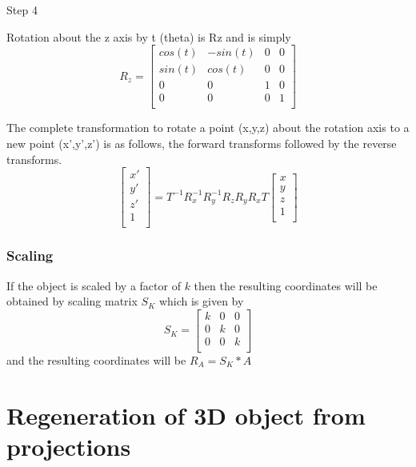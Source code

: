 \documentclass{article}
\begin{document}
 Step 4

Rotation about the z axis by t (theta) is Rz and is simply
\begin{equation}
R_{z}  =
\left[\begin{matrix}
cos(t) & -sin(t) & 0& 0\\
sin(t)  & cos(t) & 0& 0\\
0 & 0& 1& 0\\
0&0&0&1\\
\end{matrix}\right]

\end{equation}


The complete transformation to rotate a point (x,y,z) about the rotation axis to a new point (x',y',z') is as follows, the forward transforms followed by the reverse transforms.
\begin{equation}
\left[\begin{matrix}
x'\\
y'\\
z'\\
1\\
\end{matrix}\right] =
T^{-1}R_{x}^{-1}R_{y}^{-1}R_{z}R_{y}R_{x}T
\left[\begin{matrix}
x\\
y\\
z\\
1\\
\end{matrix}\right]

\end{equation}
   

\subsubsection{Scaling}
\hspace{15mm}If the object is scaled by a factor of $k$ then the resulting coordinates will be
obtained by scaling matrix $S_{K}$ which is given by
\begin{equation}
S_{K} =
\left[\begin{matrix}
k & 0 & 0\\
0 & k & 0\\
0 & 0 & k\\
\end{matrix}\right]
\end{equation}
and the resulting coordinates will be $R_{A}=S_{K}*A$
\section{Regeneration of 3D object from projections}
\end{document}
